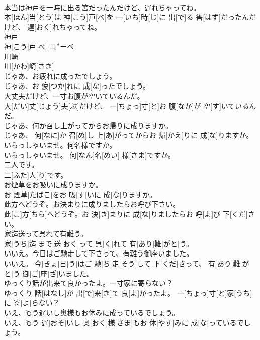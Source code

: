 \documentclass[8pt]{extreport}
\begin{document}
\begin{CJK}{UTF8}{min}
\\	本当は神戸を一時に出る筈だったんだけど、遅れちゃってね。	
\\	本[ほん]当[とう]は 神[こう]戸[べ]を 一[いち]時[じ]に 出[で]る 筈[はず]だったんだけど、 遅[おく]れちゃってね。
\\	神戸	
\\	神[こう]戸[べ]	コꜜーベ
\\	川崎	
\\	川[かわ]崎[さき]	
\\	じゃあ、お疲れに成ったでしょう。	
\\	じゃあ、お 疲[つか]れに 成[な]ったでしょう。
\\	大丈夫だけど、一寸お腹が空いているんだ。	
\\	大[だい]丈[じょう]夫[ぶ]だけど、 一[ちょっ]寸[と]お 腹[なか]が 空[す]いているんだ。
\\	じゃあ、何か召し上がってからお帰りに成りますか。	
\\	じゃあ、 何[なに]か 召[め]し 上[あ]がってからお 帰[かえ]りに 成[な]りますか。
\\	いらっしゃいませ。何名様ですか。	
\\	いらっしゃいませ。 何[なん]名[めい] 様[さま]ですか。
\\	二人です。	
\\	二[ふた]人[り]です。
\\	お煙草をお吸いに成りますか。	
\\	お 煙草[たばこ]をお 吸[す]いに 成[な]りますか。
\\	此方へどうぞ。お決まりに成りましたらお呼び下さい。	
\\	此[こ]方[ちら]へどうぞ。お 決[き]まりに 成[な]りましたらお 呼[よ]び 下[くだ]さい。
\\	家迄送って呉れて有難う。	
\\	家[うち]迄[まで]送[おく]って 呉[く]れて 有[あり]難[がと]う。
\\	いいえ。今日はご馳走して下さって、有難う御座いました。	
\\	いいえ。 今[きょ]日[う]はご 馳[ち]走[そう]して 下[くだ]さって、 有[あり]難[がと]う 御[ご]座[ざ]いました。
\\	ゆっくり話が出来て良かったよ。一寸家に寄らない？	
\\	ゆっくり 話[はなし]が 出[で]来[き]て 良[よ]かったよ。 一[ちょっ]寸[と]家[うち]に 寄[よ]らない？
\\	いえ、もう遅いし奥様もお休みに成っているでしょう。	
\\	いえ、もう 遅[おそ]いし 奥[おく]様[さま]もお 休[やす]みに 成[な]っているでしょう。

\end{CJK}
\end{document}
